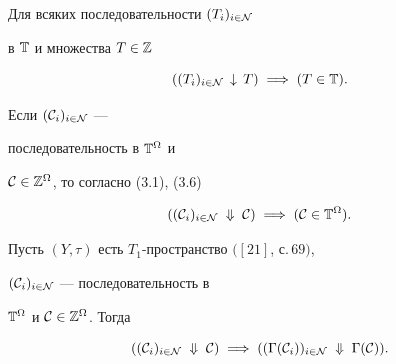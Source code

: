 Для всяких последовательности $(T_i)_{i \in {\cal N}}$


в ${\Bbb T}$ и множества $T \in {\Bbb Z}$


\begin{equation}


((T_i)_{i \in {\cal N}}\,\downarrow\,T)\;\Longrightarrow\;(T \in {\Bbb T}).


\end{equation}


Если $({\cal C}_i)_{i \in {\cal N}}$ ---


последовательность в ${\Bbb T}^{\Omega}$ и


${\cal C} \in {{\Bbb Z}^{\Omega}}$, то согласно (3.1), (3.6)


\begin{equation}


(({\cal C}_i)_{i \in {\cal N}}\;\Downarrow\;{\cal C})\;


\Longrightarrow\;({\cal C} \in {{\Bbb T}^{\Omega}}).


\end{equation}





\begin{props}


Пусть $(Y,\tau)$ есть $T_1$-пространство $([21]$, $с.\,69)$,


$({\cal C}_i)_{i \in {\cal N}}$ --- последовательность в


${\Bbb T}^{\Omega}$ и ${\cal C} \in {{\Bbb Z}^{\Omega}}$. Тогда


\begin{equation}


(({\cal C}_i)_{i \in {\cal N}}\;\Downarrow\;{\cal C})\;\Longrightarrow\;


(({\Gamma}({\cal C}_i))_{i \in {\cal N}}\;\Downarrow\;{\Gamma}({\cal C})).


\end{equation}


\end{props}





